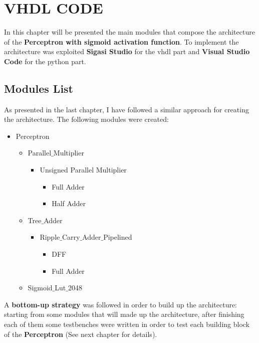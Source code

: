 \section{VHDL CODE}
In this chapter will be presented the main modules that compose the architecture of the \textbf{Perceptron with sigmoid activation function}. To implement the architecture was exploited \textbf{Sigasi  Studio} for the vhdl part and \textbf{Visual Studio Code} for the python part. 
\subsection{Modules List}
As presented in the last chapter, I have followed a similar approach for creating the architecture. The following modules were created:

\begin{itemize}
	\item Perceptron
	\begin{itemize}
		\item Parallel$\_$Multiplier
  		\begin{itemize}
  			\item Unsigned Parallel Multiplier
  			\begin{itemize}
	  			\item Full Adder
	  			\item Half Adder
  			\end{itemize}
		\end{itemize}
	\end{itemize}
	\begin{itemize}
		\item Tree$\_$Adder
		\begin{itemize}
			\item Ripple$\_$Carry$\_$Adder$\_$Pipelined
			\begin{itemize}
				\item DFF
				\item Full Adder
			\end{itemize} 
		\end{itemize} 
	\end{itemize}
	\begin{itemize}
		\item Sigmoid$\_$Lut$\_$2048
	\end{itemize}
\end{itemize}

A \textbf{bottom-up strategy} was followed in order to build up the architecture: starting from some modules that will made up the architecture, after finishing each of them some testbenches were written in order to test each building block of the \textbf{Perceptron} (See next chapter for details).
